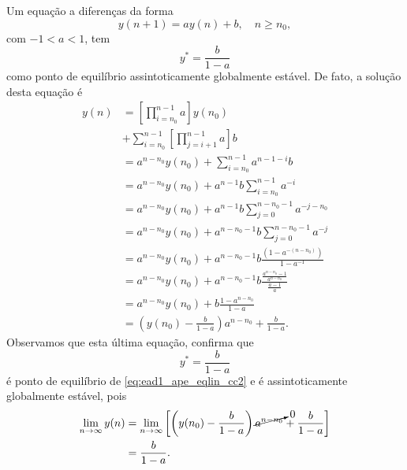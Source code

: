 Um equação a diferenças da forma
\begin{equation}\label{eq:ead1_ape_eqlin_cc2}
  y(n+1) = ay(n) + b,\quad n\geq n_0,
\end{equation}
com $-1<a<1$, tem
\begin{equation}
  y^* = \frac{b}{1-a}
\end{equation}
como ponto de equilíbrio assintoticamente globalmente estável. De fato, a solução desta equação é
\begin{align}
  y(n) &= \left[\prod_{i=n_0}^{n-1} a\right]y(n_0) \nonumber\\
       &+ \sum_{i=n_0}^{n-1}\left[\prod_{j=i+1}^{n-1} a\right]b \\
       &= a^{n-n_0}y(n_0) + \sum_{i=n_0}^{n-1}a^{n-1-i}b\\
       &= a^{n-n_0}y(n_0) + a^{n-1}b\sum_{i=n_0}^{n-1}a^{-i} \\
       &= a^{n-n_0}y(n_0) + a^{n-1}b\sum_{j=0}^{n-n_0-1}a^{-j-n_0}\\
       &= a^{n-n_0}y(n_0) + a^{n-n_0-1}b\sum_{j=0}^{n-n_0-1}a^{-j}\\
       &= a^{n-n_0}y(n_0) + a^{n-n_0-1}b\frac{(1-a^{-(n-n_0)})}{1-a^{-1}}\\
       &= a^{n-n_0}y(n_0) + a^{n-n_0-1}b\frac{\frac{a^{n-n_0}-1}{a^{n-n_0}}}{\frac{a-1}{a}}\\
       &= a^{n-n_0}y(n_0) + b\frac{1-a^{n-n_0}}{1-a} \\
       &= \left(y(n_0) - \frac{b}{1-a}\right)a^{n-n_0} + \frac{b}{1-a}.
\end{align}
Observamos que esta última equação, confirma que
\begin{equation}
  y^* = \frac{b}{1-a}
\end{equation}
é ponto de equilíbrio de \eqref{eq:ead1_ape_eqlin_cc2} e é assintoticamente globalmente estável, pois
\begin{align}
  \lim_{n\to\infty} y(n) &= \lim_{n\to\infty} \left[\left(y(n_0) - \frac{b}{1-a}\right)\cancelto{0}{a^{n-n_0}} + \frac{b}{1-a}\right] \\
                         &=  \frac{b}{1-a}.
\end{align}

